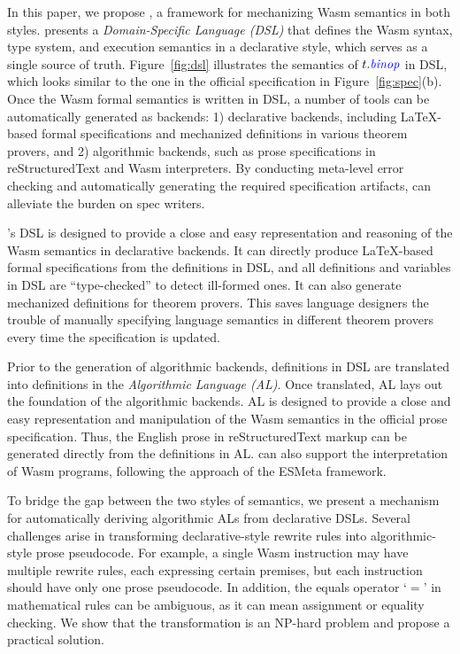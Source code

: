 In this paper, we propose \spectec, a framework for mechanizing Wasm semantics in both styles.
\spectec presents a \emph{Domain-Specific Language (DSL)} that
defines the Wasm syntax, type system, and execution semantics in a declarative style,
which serves as a single source of truth.
Figure~\ref{fig:dsl} illustrates the semantics of $t.\mathit{{\color{blue}{binop}}}$ in DSL,
which looks similar to the one in the official specification in Figure~\ref{fig:spec}(b).
Once the Wasm formal semantics is written in DSL,
a number of tools can be automatically generated as backends:
1) declarative backends, including LaTeX-based formal specifications and
mechanized definitions in various theorem provers, and
2) algorithmic backends, such as prose specifications in reStructuredText and Wasm interpreters.
By conducting meta-level error checking and automatically generating the required specification artifacts,
\spectec can alleviate the burden on spec writers.

\spectec's DSL is designed to provide a close and easy representation and reasoning of
the Wasm semantics in declarative backends.
It can directly produce LaTeX-based formal specifications from the definitions in DSL,
and all definitions and variables in DSL are ``type-checked'' to detect ill-formed ones.
It can also generate mechanized definitions for theorem provers.
This saves language designers the trouble of manually specifying
language semantics in different theorem provers every time the specification is updated.

Prior to the generation of algorithmic backends,
definitions in DSL are translated into definitions in the \emph{Algorithmic Language (AL)}.
Once translated, AL lays out the foundation of the algorithmic backends.
AL is designed to provide a close and easy representation and manipulation of
the Wasm semantics in the official prose specification.
Thus, the English prose in reStructuredText markup can be generated directly from the definitions in AL.
\spectec can also support the interpretation of Wasm programs,
following the approach of the ESMeta framework.

To bridge the gap between the two styles of semantics,
we present a mechanism for automatically deriving algorithmic ALs from declarative DSLs.
Several challenges arise in transforming declarative-style rewrite rules
into algorithmic-style prose pseudocode.
For example, a single Wasm instruction may have multiple rewrite rules,
each expressing certain premises,
but each instruction should have only one prose pseudocode. 
In addition, the equals operator `$=$' in mathematical rules
can be ambiguous, as it can mean assignment or equality checking.
We show that the transformation is an NP-hard problem
and propose a practical solution.

